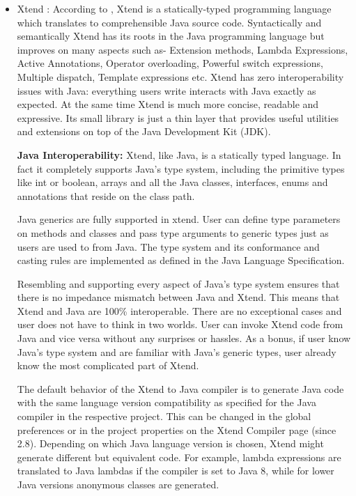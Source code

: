 \begin{itemize}
	\item Xtend : According to \cite{ref_20_xtend}, Xtend is a statically-typed programming language which translates to comprehensible Java source code. Syntactically and semantically Xtend has its roots in the Java programming language but improves on many aspects such as- Extension methods, Lambda Expressions, Active Annotations, Operator overloading, Powerful switch expressions, Multiple dispatch, Template expressions etc. Xtend has zero interoperability issues with Java: everything users write interacts with Java exactly as expected. At the same time Xtend is much more concise, readable and expressive. Its small library is just a thin layer that provides useful utilities and extensions on top of the Java Development Kit (JDK). 
	
	\textbf{Java Interoperability:}
	Xtend, like Java, is a statically typed language. In fact it completely supports Java's type system, including the primitive types like int or boolean, arrays and all the Java classes, interfaces, enums and annotations that reside on the class path.
	
	Java generics are fully supported in xtend. User can define type parameters on methods and classes and pass type arguments to generic types just as users are used to from Java. The type system and its conformance and casting rules are implemented as defined in the Java Language Specification.
	
	Resembling and supporting every aspect of Java's type system ensures that there is no impedance mismatch between Java and Xtend. This means that Xtend and Java are 100\% interoperable. There are no exceptional cases and user does not have to think in two worlds. User can invoke Xtend code from Java and vice versa without any surprises or hassles. As a bonus, if user know Java's type system and are familiar with Java's generic types, user already know the most complicated part of Xtend.
	
	The default behavior of the Xtend to Java compiler is to generate Java code with the same language version compatibility as specified for the Java compiler in the respective project. This can be changed in the global preferences or in the project properties on the Xtend  Compiler page (since 2.8). Depending on which Java language version is chosen, Xtend might generate different but equivalent code. For example, lambda expressions are translated to Java lambdas if the compiler is set to Java 8, while for lower Java versions anonymous classes are generated.
	

\end{itemize}
